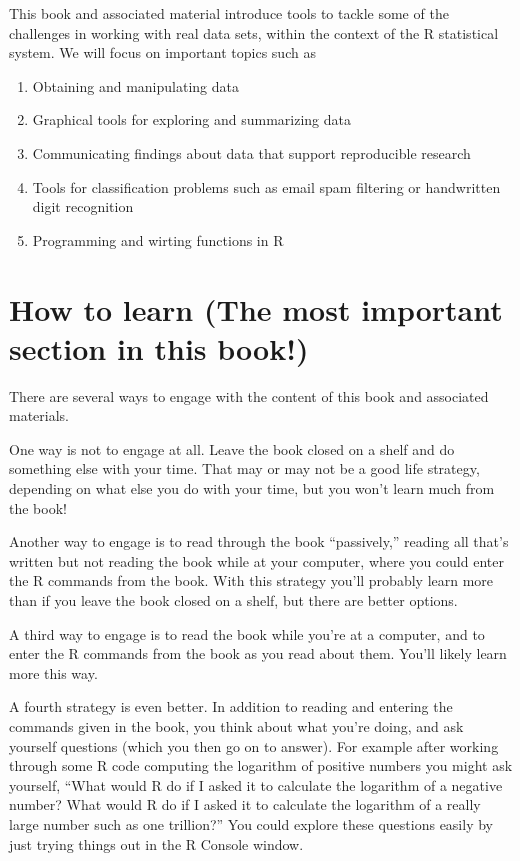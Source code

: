\documentclass[12pt,oneside]{book}\usepackage[]{graphicx}\usepackage[]{color}
\newcommand{\be}{\begin{enumerate}}
\newcommand{\ee}{\end{enumerate}}
\begin{document}
This book and associated material introduce tools to tackle some of the challenges in working with real data sets, within the context of the R statistical system. We will focus on important topics such as
\be
  \item Obtaining and manipulating data
  \item Graphical tools for exploring and summarizing data
  \item Communicating findings about data that support reproducible research
  \item Tools for classification problems such as email spam filtering or handwritten digit recognition
  \item Programming and wirting functions in R
\ee

\section{How to learn (The most important section in this book!)}
There are several ways to engage with the content of this book and associated materials. 

One way is not to engage at all. Leave the book closed on a shelf and do something else with your time. That may or may not be a good life strategy, depending on what else you do with your time, but you won't learn much from the book!

Another way to engage is to read through the book ``passively,'' reading all that's written but not reading the book while at your computer, where you could enter the R commands from the book. With this strategy you'll probably learn more than if you leave the book closed on a shelf, but there are better options.

A third way to engage is to read the book while you're at a computer, and to enter the R commands from the book as you read about them. You'll likely learn more this way.

A fourth strategy is even better. In addition to reading and entering the commands given in the book, you think about what you're doing, and ask yourself questions (which you then go on to answer). For example after working through some R code computing the logarithm of positive numbers you might ask yourself, ``What would R do if I asked it to calculate the logarithm of a negative number? What would R do if I asked it to calculate the logarithm of a really large number such as one trillion?'' You could explore these questions easily by just trying things out in the R Console window. 
\end{document}
